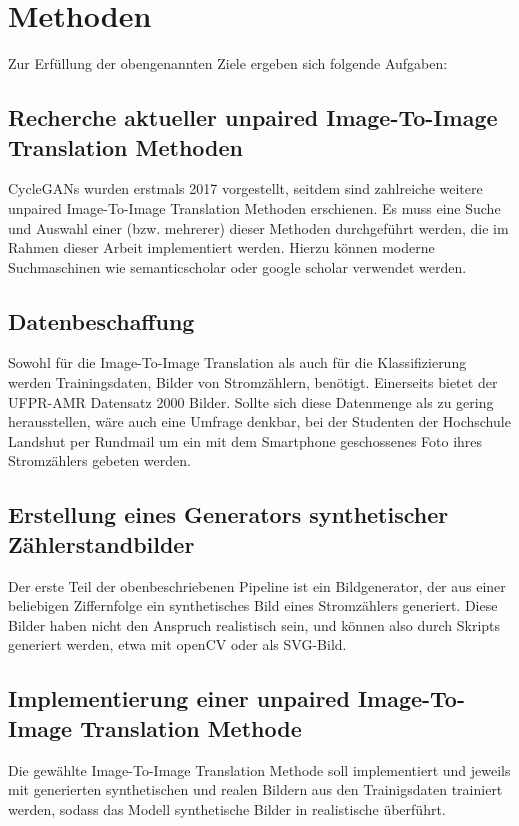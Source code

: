 \chapter*{Methoden}
Zur Erfüllung der obengenannten Ziele ergeben sich folgende Aufgaben:
\section*{Recherche aktueller unpaired Image-To-Image Translation Methoden}
CycleGANs wurden erstmals 2017 vorgestellt, seitdem sind zahlreiche weitere unpaired Image-To-Image Translation Methoden erschienen.
Es muss eine Suche und Auswahl einer (bzw. mehrerer) dieser Methoden durchgeführt werden, die im Rahmen dieser Arbeit implementiert werden.
Hierzu können moderne Suchmaschinen wie semanticscholar oder google scholar verwendet werden.
\section*{Datenbeschaffung}
Sowohl für die Image-To-Image Translation als auch für die Klassifizierung werden Trainingsdaten, Bilder von Stromzählern, benötigt.
Einerseits bietet der UFPR-AMR Datensatz 2000 Bilder. Sollte sich diese Datenmenge als zu gering herausstellen, wäre auch eine Umfrage denkbar,
bei der Studenten der Hochschule Landshut per Rundmail um ein mit dem Smartphone geschossenes Foto ihres Stromzählers gebeten werden.
\section*{Erstellung eines Generators synthetischer Zählerstandbilder}
Der erste Teil der obenbeschriebenen Pipeline ist ein Bildgenerator, der aus einer beliebigen Ziffernfolge ein synthetisches Bild eines Stromzählers generiert.
Diese Bilder haben nicht den Anspruch realistisch sein, und können also durch Skripts generiert werden, etwa mit openCV oder als SVG-Bild.
\section*{Implementierung einer unpaired Image-To-Image Translation Methode}
Die gewählte Image-To-Image Translation Methode soll implementiert und jeweils mit generierten synthetischen und realen Bildern aus den Trainigsdaten trainiert werden,
sodass das Modell synthetische Bilder in realistische überführt.
